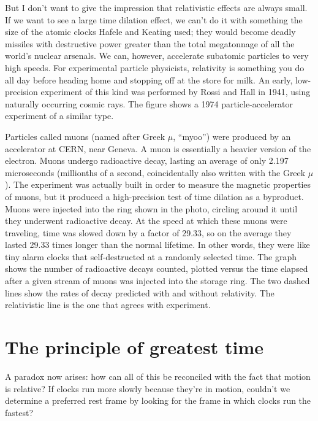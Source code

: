 But I don't want to give the impression that relativistic effects are always small.
If we want to see a large time dilation
effect, we can't do it with something the size of the atomic clocks Hafele and Keating used; they would become deadly missiles with
destructive power
greater than the total megatonnage of all the world's nuclear arsenals. We can, however, accelerate subatomic particles
to very high speeds. For experimental particle physicists, relativity is something you do all day
before heading home and stopping off at the store for milk. An early, low-precision experiment of this kind was
performed by Rossi and Hall in 1941, using naturally occurring cosmic rays. The figure shows
a 1974 particle-accelerator experiment of a similar type.




Particles called muons (named after Greek $\mu$, ``myoo'') were produced by an
accelerator at CERN, near Geneva. A muon is essentially a heavier version
of the electron. Muons undergo radioactive decay,
lasting an average of only 2.197 microseconds (millionths of a second, coincidentally also written with the Greek $\mu$).
The experiment was actually built in order to measure the magnetic properties of muons, but it produced a high-precision
test of time dilation as a byproduct.
Muons were injected into the ring shown in the photo, circling around it until
they underwent radioactive decay.
At the speed at which these muons were traveling, time was slowed down by
a factor of 29.33, so on the average they lasted 29.33 times
longer than the normal lifetime. In other words, they were like tiny alarm clocks that self-destructed at a randomly
selected time. The graph shows the number of radioactive decays counted, plotted versus the
time elapsed after a given stream of muons was injected into the storage ring. The two dashed lines show the rates
of decay predicted with and without relativity. The relativistic line is the one that agrees with experiment.

\section{The principle of greatest time}


A paradox now arises: how can all of this be reconciled with the fact that motion is relative?
If clocks run more slowly because they're in motion, couldn't we determine a preferred rest frame
by looking for the frame in which clocks run the fastest?

